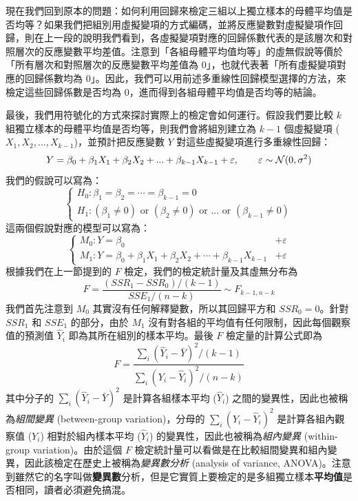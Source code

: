     \medskip

    現在我們回到原本的問題：如何利用回歸來檢定三組以上獨立樣本的母體平均值是否均等？如果我們把組別用虛擬變項的方式編碼，並將反應變數對虛擬變項作回歸，則在上一段的說明我們看到，各虛擬變項對應的回歸係數代表的是該層次和對照層次的反應變數平均差值。注意到「各組母體平均值均等」的虛無假說等價於「所有層次和對照層次的反應變數平均差值為 $0$」，也就代表著「所有虛擬變項對應的回歸係數均為 $0$」。因此，我們可以用前述多重線性回歸模型選擇的方法，來檢定這些回歸係數是否均為 $0$，進而得到各組母體平均值是否均等的結論。

    \medskip

    最後，我們用符號化的方式來探討實際上的檢定會如何運行。假設我們要比較 $k$ 組獨立樣本的母體平均值是否均等，則我們會將組別建立為 $k-1$ 個虛擬變項 ($X_1, X_2,...,X_{k-1}$)，並預計把反應變數 $Y$ 對這些虛擬變項進行多重線性回歸：
    \smallskip
    \[Y = \beta_0 + \beta_1 X_1 + \beta_2 X_2 + ... + \beta_{k-1} X_{k-1} + \varepsilon, \qquad \varepsilon \sim \mathcal{N}(0, \sigma^2)\]
    \smallskip
    我們的假說可以寫為：
    \smallskip
    \[\left\{\begin{array}{l}
        H_0: \beta_1 = \beta_2 = \cdots = \beta_{k-1} = 0\\
        H_1: (\beta_1 \ne 0) \text{ or } (\beta_2 \ne 0) \text{ or } ... \text{ or } (\beta_{k-1} \ne 0)
    \end{array}\right.\]
    \smallskip
    這兩個假說對應的模型可以寫為：
    \smallskip
    \[\left\{\begin{array}{ll}
        M_0: Y = \beta_0  &+ \varepsilon\\
        M_1: Y = \beta_0 + \beta_1 X_1 + \beta_2 X_2 + \cdots  + \beta_{k-1} X_{k-1} &+ \varepsilon
    \end{array}\right.\]
    \smallskip
    根據我們在上一節提到的 $F$ 檢定，我們的檢定統計量及其虛無分布為
    \smallskip
    \[F = \frac{(SSR_1 - SSR_0)/(k-1)}{SSE_1/(n-k)} \sim F_{k-1, n-k}\]
    \smallskip
    我們首先注意到 $M_0$ 其實沒有任何解釋變數，所以其回歸平方和 $SSR_0 = 0$。針對 $SSR_1$ 和 $SSE_1$ 的部分，由於 $M_1$ 沒有對各組的平均值有任何限制，因此每個觀察值的預測值 $\hat{Y}_i$ 即為其所在組別的樣本平均。最後 $F$ 檢定量的計算公式即為
    \[F = \frac{\sum_i (\hat{Y}_i-\bar{Y})^2/(k-1)}{\sum_i (Y_i-\hat{Y}_i)^2/(n-k)}\]
    其中分子的 $\sum_i (\hat{Y}_i-\bar{Y})^2$ 是計算各組樣本平均 ($\hat{Y}_i$) 之間的變異性，因此也被稱為\textit{組間變異} (between-group variation)，分母的 $\sum_i (Y_i-\hat{Y}_i)^2$ 是計算各組內觀察值 ($Y_i$) 相對於組內樣本平均 ($\hat{Y}_i$) 的變異性，因此也被稱為\textit{組內變異} (within-group variation)。由於這個 $F$ 檢定統計量可以看做是在比較組間變異和組內變異，因此該檢定在歷史上被稱為\textit{變異數分析} (analysis of variance, ANOVA)。注意到雖然它的名字叫做\textbf{變異數}分析，但是它實質上要檢定的是多組獨立樣本\textbf{平均值}是否相同，讀者必須避免搞混。


